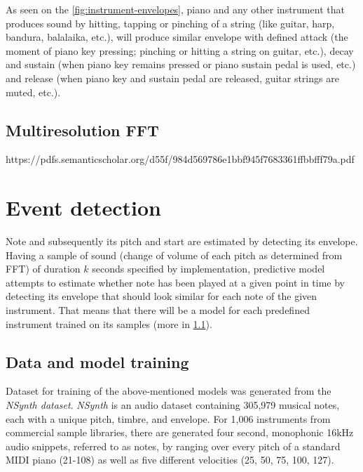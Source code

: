 
As seen on the \cref{fig:instrument-envelopes}, piano and any other instrument that produces sound by hitting, tapping
or pinching of a string (like guitar, harp, bandura, balalaika, etc.), will produce similar envelope with defined
attack (the moment of piano key pressing; pinching or hitting a string on guitar, etc.), decay and sustain (when piano
key remains pressed or piano sustain pedal is used, etc.) and release (when piano key and sustain pedal are released,
guitar strings are muted, etc.).


\subsection{Multiresolution \ac{FFT}}\label{subsec:multiresolution-fft}
https://pdfs.semanticscholar.org/d55f/984d569786e1bbf945f7683361ffbbfff79a.pdf

\section{Event detection}\label{sec:event-detection}

Note and subsequently its pitch and start are estimated by detecting its envelope. Having a sample of sound (change of
volume of each pitch as determined from \ac{FFT}) of duration $k$ seconds specified by implementation, predictive model
attempts to estimate whether note has been played at a given point in time by detecting its envelope that should look
similar for each note of the given instrument. That means that there will be a model for each predefined instrument
trained on its samples (more in \cref{subsec:data-and-model-training}).

\subsection{Data and model training}\label{subsec:data-and-model-training}
Dataset for training of the above-mentioned models was generated from the \textit{NSynth dataset}\cite{nsynth2017}.
\textit{NSynth} is an audio dataset containing 305,979 musical notes, each with a unique pitch, timbre, and envelope.
For 1,006 instruments from commercial sample libraries, there are generated four second, monophonic 16kHz audio
snippets, referred to as notes, by ranging over every pitch of a standard MIDI piano (21-108) as well as five different
velocities (25, 50, 75, 100, 127)\cite{nsynth2017}.

